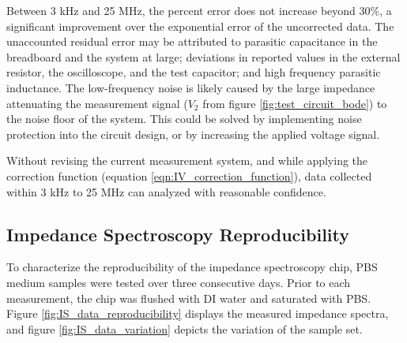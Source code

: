 \par Between 3 kHz and 25 MHz, the percent error does not increase beyond 30\%, a significant improvement over the exponential error of the uncorrected data. The unaccounted residual error may be attributed to parasitic capacitance in the breadboard and the system at large; deviations in reported values in the external resistor, the oscilloscope, and the test capacitor; and high frequency parasitic inductance. The low-frequency noise is likely caused by the large impedance attenuating the measurement signal ($V_2$ from figure \ref{fig:test_circuit_bode}) to the noise floor of the system. This could be solved by implementing noise protection into the circuit design, or by increasing the applied voltage signal. 

\par Without revising the current measurement system, and while applying the correction function (equation \ref{eqn:IV_correction_function}), data collected within 3 kHz to 25 MHz can analyzed with reasonable confidence. 

\FloatBarrier

\clearpage

\subsection{Impedance Spectroscopy Reproducibility}

\par To characterize the reproducibility of the impedance spectroscopy chip, PBS medium samples were tested over three consecutive days. Prior to each measurement, the chip was flushed with DI water and saturated with PBS. Figure \ref{fig:IS_data_reproducibility} displays the measured impedance spectra, and figure \ref{fig:IS_data_variation} depicts the variation of the sample set. 

